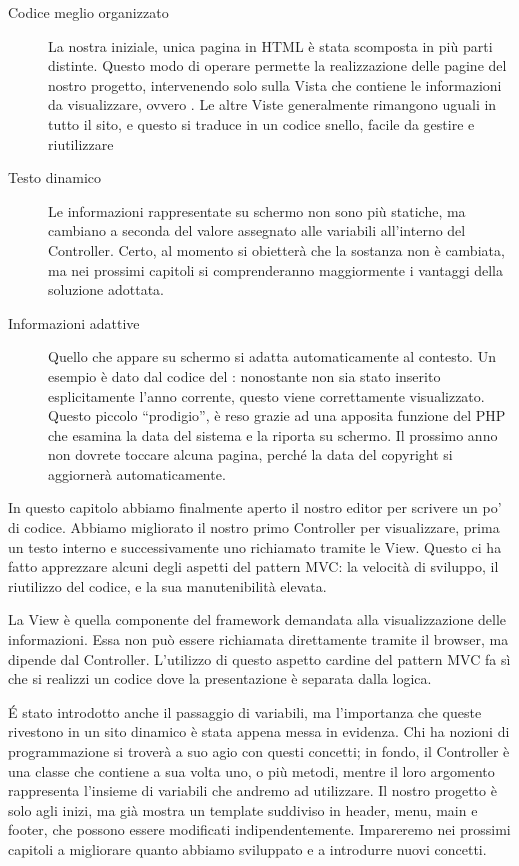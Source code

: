 \begin{description}
\item[Codice meglio organizzato] La nostra iniziale, unica pagina in \ac{HTML} è stata scomposta in più parti distinte. Questo modo di operare permette la realizzazione delle pagine del nostro progetto, intervenendo solo sulla Vista che contiene le informazioni da visualizzare, ovvero . Le altre Viste generalmente rimangono uguali in tutto il sito, e questo si traduce in un codice snello, facile da gestire e riutilizzare
\item[Testo dinamico] Le informazioni rappresentate su schermo non sono più statiche, ma cambiano a seconda del valore assegnato alle variabili all'interno del Controller. Certo, al momento si obietterà che la sostanza non è cambiata, ma nei prossimi capitoli si comprenderanno maggiormente i vantaggi della soluzione adottata.
\item[Informazioni adattive] Quello che appare su schermo si adatta automaticamente al contesto. Un esempio è dato dal codice del : nonostante non sia stato inserito esplicitamente l'anno corrente, questo viene correttamente visualizzato. Questo piccolo ``prodigio'', è reso grazie ad una apposita funzione del \ac{PHP} che esamina la data del sistema e la riporta su schermo. Il prossimo anno non dovrete toccare alcuna pagina, perché la data del copyright si aggiornerà automaticamente.
\end{description}

In questo capitolo abbiamo finalmente aperto il nostro editor per scrivere un po' di codice. Abbiamo migliorato il nostro primo Controller per visualizzare, prima un testo interno e successivamente uno richiamato tramite le View. Questo ci ha fatto apprezzare alcuni degli aspetti del pattern \ac{MVC}: la velocità di sviluppo, il riutilizzo del codice, e la sua manutenibilità elevata. 

La View è quella componente del framework demandata alla visualizzazione delle informazioni. Essa non può essere richiamata direttamente tramite il browser, ma dipende dal Controller. L'utilizzo di questo aspetto cardine del pattern \ac{MVC} fa sì che si realizzi un codice dove la presentazione è separata dalla logica.

\'E stato introdotto anche il passaggio di variabili, ma l'importanza che queste rivestono in un sito dinamico è stata appena messa in evidenza. Chi ha nozioni di programmazione si troverà a suo agio con questi concetti; in fondo, il Controller è una classe che contiene a sua volta uno, o più metodi, mentre il loro argomento rappresenta l'insieme di variabili che andremo ad utilizzare. Il nostro progetto è solo agli inizi, ma già mostra un template suddiviso in header, menu, main e footer, che possono essere modificati indipendentemente. Impareremo nei prossimi capitoli a migliorare quanto abbiamo sviluppato e a introdurre nuovi concetti.
